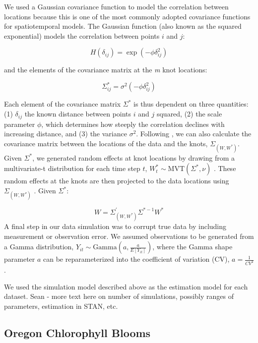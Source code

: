 \documentclass[12pt,english]{article}
\begin{document}
We used a Gaussian covariance function to model the correlation between
locations because this is one of the most commonly adopted covariance functions
for spatiotemporal models. The Gaussian function (also known as the squared
exponential) models the correlation between points $i$ and $j$:

\[H(\delta_{ij}) = \exp \left(-\phi \delta_{ij}^2 \right)\]

and the elements of the covariance matrix at the \emph{m} knot locations:

\[\Sigma_{ij}^*=\sigma^2 \left( -\phi \delta_{ij}^2 \right)\]

Each element of the covariance matrix ${{\Sigma}}^{*}$ is thus dependent on
three quantities: (1) $\delta_{ij}$ the known distance between points $i$ and
$j$ squared, (2) the scale parameter $\phi$, which determines how steeply the
correlation declines with increasing distance, and (3) the variance $\sigma^2$.
Following \citep{latimer2009}, we can also calculate the covariance matrix
between the locations of the data and the knots, 
$\Sigma_{\left(W, W^* \right)}$. 
Given $\Sigma^*$, we generated random effects at knot
locations by drawing from a multivariate-t distribution for each time step
$t$, $W_t^*\sim \mathrm{MVT}\left( \Sigma^{*},\nu \right)$ .
These random effects at the knots are then projected to the data locations
using $\Sigma_{\left( W,{W}^{*} \right)}$ \citep{latimer2009}. Given
${\Sigma}^{*}$:

\[{{W=\Sigma }_{\left( W,{W}^{*} \right) }^{'}}{\Sigma }^{*-1}{
    W}^{*}\] A final step in our data simulation was to corrupt true data by
including measurement or observation error. We assumed observations to be
generated from a Gamma distribution, ${Y}_{it}\sim \mathrm{Gamma}\left(
    a,\frac {a}{E[{Y}_{it}]} \right)$, where the Gamma shape parameter
$a$ can be reparameterized into the coefficient of variation (CV), $a=\frac
  {1}{{CV}^{2}}$.

We used the simulation model described above as the estimation model for each
dataset. Sean - more text here on number of simulations, possibly ranges of
parameters, estimation in STAN, etc.

\subsection{Oregon Chlorophyll Blooms}
\end{document}
